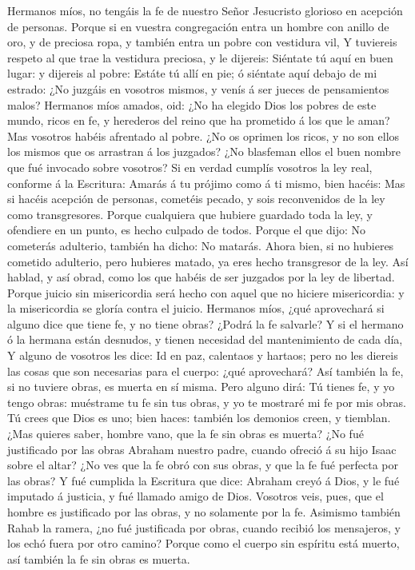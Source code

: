  Hermanos míos, no tengáis la fe de nuestro Señor
Jesucristo glorioso en acepción de personas.  Porque si en
vuestra congregación entra un hombre con anillo de oro, y de preciosa
ropa, y también entra un pobre con vestidura vil,  Y
tuviereis respeto al que trae la vestidura preciosa, y le dijereis:
Siéntate tú aquí en buen lugar: y dijereis al pobre: Estáte tú allí en
pie; ó siéntate aquí debajo de mi estrado:  ¿No juzgáis en
vosotros mismos, y venís á ser jueces de pensamientos malos?
 Hermanos míos amados, oid: ¿No ha elegido Dios los pobres
de este mundo, ricos en fe, y herederos del reino que ha prometido á los
que le aman?  Mas vosotros habéis afrentado al pobre. ¿No
os oprimen los ricos, y no son ellos los mismos que os arrastran á los
juzgados?  ¿No blasfeman ellos el buen nombre que fué
invocado sobre vosotros?  Si en verdad cumplís vosotros la
ley real, conforme á la Escritura: Amarás á tu prójimo como á ti mismo,
bien hacéis:  Mas si hacéis acepción de personas, cometéis
pecado, y sois reconvenidos de la ley como transgresores.
 Porque cualquiera que hubiere guardado toda la ley, y
ofendiere en un punto, es hecho culpado de todos.  Porque
el que dijo: No cometerás adulterio, también ha dicho: No matarás. Ahora
bien, si no hubieres cometido adulterio, pero hubieres matado, ya eres
hecho transgresor de la ley.  Así hablad, y así obrad,
como los que habéis de ser juzgados por la ley de libertad.
 Porque juicio sin misericordia será hecho con aquel que
no hiciere misericordia: y la misericordia se gloría contra el juicio.
 Hermanos míos, ¿qué aprovechará si alguno dice que tiene
fe, y no tiene obras? ¿Podrá la fe salvarle?  Y si el
hermano ó la hermana están desnudos, y tienen necesidad del
mantenimiento de cada día,  Y alguno de vosotros les
dice: Id en paz, calentaos y hartaos; pero no les diereis las cosas que
son necesarias para el cuerpo: ¿qué aprovechará?  Así
también la fe, si no tuviere obras, es muerta en sí misma.
 Pero alguno dirá: Tú tienes fe, y yo tengo obras:
muéstrame tu fe sin tus obras, y yo te mostraré mi fe por mis obras.
 Tú crees que Dios es uno; bien haces: también los
demonios creen, y tiemblan.  ¿Mas quieres saber, hombre
vano, que la fe sin obras es muerta?  ¿No fué justificado
por las obras Abraham nuestro padre, cuando ofreció á su hijo Isaac
sobre el altar?  ¿No ves que la fe obró con sus obras, y
que la fe fué perfecta por las obras?  Y fué cumplida la
Escritura que dice: Abraham creyó á Dios, y le fué imputado á justicia,
y fué llamado amigo de Dios.  Vosotros veis, pues, que el
hombre es justificado por las obras, y no solamente por la fe.
 Asimismo también Rahab la ramera, ¿no fué justificada
por obras, cuando recibió los mensajeros, y los echó fuera por otro
camino?  Porque como el cuerpo sin espíritu está muerto,
así también la fe sin obras es muerta.


